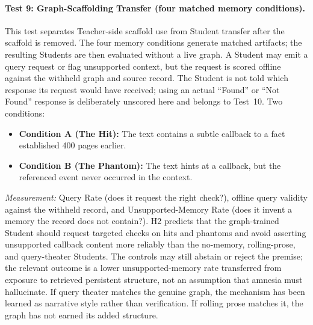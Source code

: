 \paragraph{Test 9: Graph-Scaffolding Transfer (four matched memory conditions).}
This test separates Teacher-side scaffold use from Student transfer after the
scaffold is removed. The four memory conditions generate matched artifacts; the
resulting Students are then evaluated without a live graph. A Student may emit
a query request or flag unsupported context, but the request is scored offline
against the withheld graph and source record. The Student is not told which
response its request would have received; using an actual ``Found'' or ``Not
Found'' response is deliberately unscored here and belongs to Test~10. Two
conditions:
\begin{itemize}
    \item \textbf{Condition A (The Hit):} The text contains a subtle
    callback to a fact established 400 pages earlier.
    \item \textbf{Condition B (The Phantom):} The text hints at a callback,
    but the referenced event never occurred in the context.
\end{itemize}
\emph{Measurement:} Query Rate (does it request the right check?), offline query
validity against the withheld record, and Unsupported-Memory Rate (does it
invent a memory the record does not contain?). H2 predicts that the graph-trained
Student should request targeted checks on hits and phantoms and avoid asserting
unsupported callback content more reliably than the no-memory, rolling-prose,
and query-theater Students. The controls may still abstain or reject the premise;
the relevant outcome is a
lower unsupported-memory rate transferred from exposure to retrieved persistent
structure, not an assumption that amnesia must hallucinate. If query theater
matches the genuine graph, the mechanism has been learned as narrative style
rather than verification. If rolling prose matches it, the graph has not earned
its added structure.

